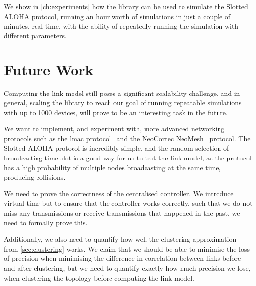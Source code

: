 


We show in \autoref{ch:experiments} how the library can be used to simulate the Slotted ALOHA protocol, running an hour worth of simulations in just a couple of minutes, real-time, with the ability of repeatedly running the simulation with different parameters.


\section{Future Work}\label{sec:futurework}
Computing the link model still poses a significant scalability challenge, and in general, scaling the library to reach our goal of running repeatable simulations with up to 1000 devices, will prove to be an interesting task in the future.\smallbreak

We want to implement, and experiment with, more advanced networking protocols such as the \gls{lmac} protocol~\cite{paper:lmac_protocol} and the NeoCortec NeoMesh~\cite{website:neocortec} protocol. The Slotted ALOHA protocol is incredibly simple, and the random selection of broadcasting time slot is a good way for us to test the link model, as the protocol has a high probability of multiple nodes broadcasting at the same time, producing collisions.\smallbreak

We need to prove the correctness of the centralised controller. We introduce virtual time but to ensure that the controller works correctly, such that we do not miss any transmissions or receive transmissions that happened in the past, we need to formally prove this.\smallbreak

Additionally, we also need to quantify how well the clustering approximation from \autoref{sec:clustering} works. We claim that we should be able to minimise the loss of precision when minimising the difference in correlation between links before and after clustering, but we need to quantify exactly how much precision we lose, when clustering the topology before computing the link model. \smallbreak


